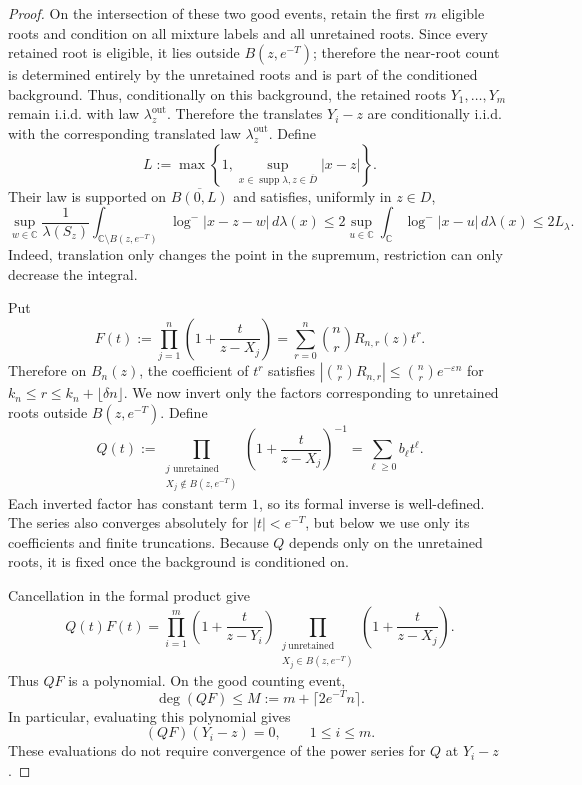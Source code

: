\documentclass[10pt,a4paper]{amsart}
\newcommand{\C}{\mathbb C}
\begin{document}
\begin{proof}
    On the intersection of these two good events, retain the first $m$ eligible roots and condition on all mixture labels and all unretained roots. Since every retained root is eligible, it lies outside $B(z,e^{-T})$; therefore the near-root count is determined entirely by the unretained roots and is part of the conditioned background. Thus, conditionally on this background, the retained roots $Y_1,\ldots, Y_m$ remain i.i.d. with law $\lambda_z^{\mathrm{out}}$. Therefore the translates $Y_i-z$ are conditionally i.i.d. with the corresponding translated law $\lambda_z^{\mathrm{out}}$. Define
    \[L:=\max\left\{1,\sup_{x\in \operatorname{supp} \lambda,z\in \overline{D}}|x-z|\right\}.\]
    Their law is supported on $\overline{B(0,L)}$ and satisfies, uniformly in $z\in D$,
    \[\sup_{w\in\C}\frac{1}{\lambda(S_z)}\int_{\C\setminus B(z,e^{-T})}\log^-|x-z-w|\,d\lambda(x)
    \le 2\sup_{u\in\C}\int_\C\log^-|x-u|\,d\lambda(x) 
    \le 2L_\lambda.\]
    Indeed, translation only changes the point in the supremum, restriction can only decrease the integral.

    Put
    \[F(t):=\prod_{j=1}^n\left(1+\frac{t}{z-X_j}\right)=\sum_{r=0}^n \binom{n}{r}R_{n,r}(z)t^r.\]
    Therefore on $B_n(z)$, the coefficient of $t^r$ satisfies $|\binom{n}{r}R_{n,r}|\le \binom{n}{r}e^{-\varepsilon n}$ for $k_n\le r\le k_n+\lfloor \delta n\rfloor$.
    We now invert only the factors corresponding to unretained roots outside $B(z,e^{-T})$. Define 
    \[Q(t):=\prod_{\substack{j\text{ unretained}\\
                     X_j\notin B(z,e^{-T})}}
    \left(1+\frac{t}{z-X_j}\right)^{-1}=\sum_{\ell\ge 0}b_\ell t^\ell.\]
    Each inverted factor has constant term $1$, so its formal inverse is well-defined. The series also converges absolutely for $|t|<e^{-T}$, but below we use only its coefficients and finite truncations. Because $Q$ depends only on the unretained roots, it is fixed once the background is conditioned on.

    Cancellation in the formal product give
    \[Q(t)F(t)=
    \prod_{i=1}^{m}\left(1+\frac{t}{z-Y_i}\right)\prod_{\substack{j\ \mathrm{unretained}\\X_j\in B(z,e^{-T})}}\left(1+\frac{t}{z-X_j}\right).\]
    Thus $QF$ is a polynomial. On the good counting event,
    \[\deg(QF)\leq M:=m+\lceil 2e^{-T}n\rceil.\]
    In particular, evaluating this polynomial gives
    \[(QF)(Y_i-z)=0,\qquad 1\leq i\leq m.\]
    These evaluations do not require convergence of the power series for $Q$ at $Y_i-z$.
    

\end{proof}
\end{document}
